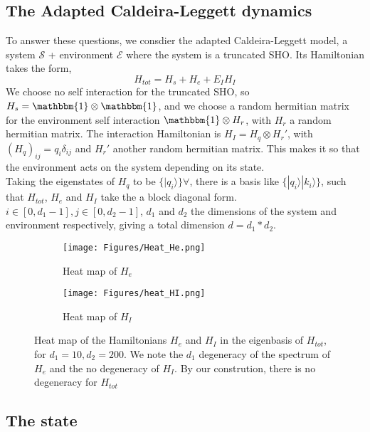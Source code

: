 \documentclass{article}
\begin{document}
\subsection{The Adapted Caldeira-Leggett dynamics}
To answer these questions, we consdier the adapted Caldeira-Leggett model, a system $\mathcal{S}$ + environment $\mathcal{E}$ where the system is a truncated SHO. Its Hamiltonian takes the form,
\begin{equation}    
    H_{tot}=H_s+H_e+E_IH_I
\end{equation}
We choose no self interaction for the truncated SHO, so $H_s=\mathbbm{1}\otimes\mathbbm{1}$, and we choose a random hermitian matrix for the environment self interaction $\mathbbm{1}\otimes H_r$, with $H_r$ a random hermitian matrix. The interaction Hamiltonian is $H_I=H_q\otimes H_r'$, with $(H_q)_{ij}=q_i\delta_{ij}$ and $H_r'$ another random hermitian matrix. This makes it so that the environment acts on the system depending on its state. \\
Taking the eigenstates of $H_q$ to be $\{|q_i\rangle\}\forall$, there is a basis like $\{|q_i\rangle|k_i\rangle\}$, such that $H_{tot}$, $H_e$ and $H_I$ take the a block diagonal form. $i\in[0,d_1-1],j\in [0,d_2-1]$, $d_1$ and $d_2$ the dimensions of the system and environment respectively, giving a total dimension $d=d_1*d_2$.
\begin{figure}[h!]
  \centering
  \begin{subfigure}[b]{0.4\linewidth}
    \texttt{[image: Figures/Heat\_He.png]}
    \label{fig:1}
    \caption{Heat map of $H_e$}
  \end{subfigure}
  \begin{subfigure}[b]{0.4\linewidth}
    \texttt{[image: Figures/heat\_HI.png]}
    \label{fig:2}
    \caption{Heat map of $H_I$}
  \end{subfigure}
  \caption{}
  \label{fig:dist_EI_dep}
  \caption{Heat map of the Hamiltonians $H_e$ and $H_I$ in the eigenbasis of $H_{tot}$, for $d_1=10,d_2=200$. We note the $d_1$ degeneracy of the spectrum of $H_e$ and the no degeneracy of $H_I$. By our constrution, there is no degeneracy for $H_{tot}$}
\end{figure}

\subsection{The state}
\end{document}
